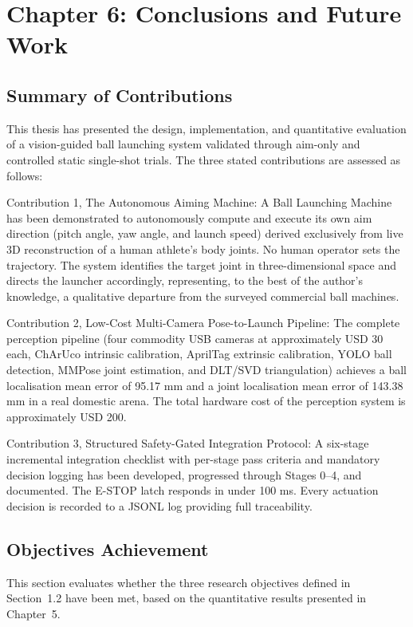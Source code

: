 \chapter{Chapter 6: Conclusions and Future Work}

\section{Summary of Contributions}

This thesis has presented the design, implementation, and quantitative evaluation of a vision-guided ball launching system validated through aim-only and controlled static single-shot trials. The three stated contributions are assessed as follows:

Contribution 1, The Autonomous Aiming Machine: A Ball Launching Machine has been demonstrated to autonomously compute and execute its own aim direction (pitch angle, yaw angle, and launch speed) derived exclusively from live 3D reconstruction of a human athlete's body joints. No human operator sets the trajectory. The system identifies the target joint in three-dimensional space and directs the launcher accordingly, representing, to the best of the author's knowledge, a qualitative departure from the surveyed commercial ball machines.

Contribution 2, Low-Cost Multi-Camera Pose-to-Launch Pipeline: The complete perception pipeline (four commodity USB cameras at approximately USD 30 each, ChArUco intrinsic calibration, AprilTag extrinsic calibration, YOLO ball detection, MMPose joint estimation, and DLT/SVD triangulation) achieves a ball localisation mean error of 95.17 mm and a joint localisation mean error of 143.38 mm in a real domestic arena. The total hardware cost of the perception system is approximately USD 200.

Contribution 3, Structured Safety-Gated Integration Protocol: A six-stage incremental integration checklist with per-stage pass criteria and mandatory decision logging has been developed, progressed through Stages 0--4, and documented. The E-STOP latch responds in under 100 ms. Every actuation decision is recorded to a JSONL log providing full traceability.

\section{Objectives Achievement}

This section evaluates whether the three research objectives defined in Section~1.2 have been met, based on the quantitative results presented in Chapter~5.


